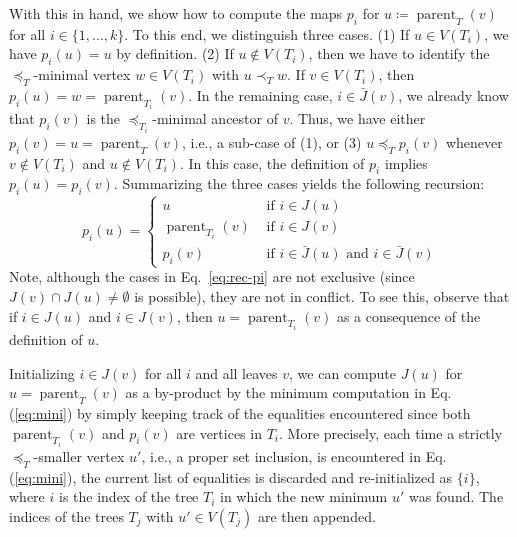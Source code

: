 \documentclass[11pt]{article}
\newcommand{\parent}{\operatorname{parent}}
\begin{document}
With this in hand, we show how to compute the maps $p_i$ for
$u\coloneqq \parent_T(v)$ for all $i\in \{1,\dots,k\}$. To this end, we
distinguish three cases. (1) If $u\in V(T_i)$, we have $p_i(u)=u$ by
definition. (2) If $u\notin V(T_i)$, then we have to identify the
$\preceq_T$-minimal vertex $w\in V(T_i)$ with $u\prec_T w$.  If
$v\in V(T_i)$, then $p_i(u)=w=\parent_{T_i}(v)$. In the remaining case,
$i\in \bar J(v)$, we already know that $p_i(v)$ is the
$\preceq_{T_i}$-minimal ancestor of $v$. Thus, we have either
$p_i(v)=u=\parent_T(v)$, i.e., a sub-case of (1), or (3)
$u\preceq_T p_i(v)$ whenever $v\notin V(T_i)$ and $u\notin V(T_i)$. In this
case, the definition of $p_i$ implies $p_i(u)=p_i(v)$. Summarizing the
three cases yields the following recursion:
\begin{equation}
  \label{eq:rec-pi}
  p_i(u) = \begin{cases}
    u                 & \text{ if } i\in J(u) \\
    \parent_{T_i}(v)  & \text{ if } i\in J(v) \\
    p_i(v)            & \text{ if } i\in \bar J(u)
    \text{ and } i \in\bar J(v)
  \end{cases}
\end{equation}
Note, although the cases in Eq.\ \eqref{eq:rec-pi} are not exclusive (since
$J(v)\cap J(u)\neq \emptyset$ is possible), they are not in conflict. To
see this, observe that if $i\in J(u)$ and $i\in J(v)$, then
$u=\parent_{T_i}(v)$ as a consequence of the definition of
$u$.

Initializing $i\in J(v)$ for all $i$ and all leaves $v$, we can
compute $J(u)$ for $u=\parent_T(v)$ as a by-product by the minimum
computation in Eq.(\ref{eq:mini}) by simply keeping track of the equalities
encountered since both $\parent_{T_i}(v)$ and $p_i(v)$ are vertices in
$T_i$. More precisely, each time a strictly $\preceq_T$-smaller vertex
$u'$, i.e., a proper set inclusion, is encountered in Eq.(\ref{eq:mini}),
the current list of equalities is discarded and re-initialized as $\{i\}$,
where $i$ is the index of the tree $T_i$ in which the new minimum $u'$ was
found. The indices of the trees $T_j$ with $u'\in V(T_j)$ are then
appended.
\end{document}

